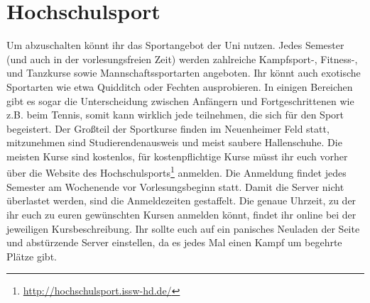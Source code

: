 \section{Hochschulsport}
Um abzuschalten könnt ihr das Sportangebot der Uni nutzen. Jedes Semester (und auch in der vorlesungsfreien Zeit) werden zahlreiche Kampfsport-, Fitness-, und Tanzkurse sowie Mannschaftssportarten angeboten. Ihr könnt auch exotische Sportarten wie etwa Quidditch oder Fechten ausprobieren. In einigen Bereichen gibt es sogar die Unterscheidung zwischen Anfängern und Fortgeschrittenen wie z.B. beim Tennis, somit kann wirklich jede teilnehmen, die sich für den Sport begeistert.
Der Großteil der Sportkurse finden im Neuenheimer Feld statt, mitzunehmen sind Studierendenausweis und meist saubere Hallenschuhe.
Die meisten Kurse sind kostenlos, für kostenpflichtige Kurse müsst ihr euch vorher über die Website des Hochschulsports\footnote{\url{http://hochschulsport.issw-hd.de/}} anmelden. Die Anmeldung findet jedes Semester am Wochenende vor Vorlesungsbeginn statt. Damit die Server nicht überlastet werden, sind die Anmeldezeiten gestaffelt. Die genaue Uhrzeit, zu der ihr euch zu euren gewünschten Kursen anmelden könnt, findet ihr online bei der jeweiligen Kursbeschreibung. Ihr sollte euch auf ein panisches Neuladen der Seite und abstürzende Server einstellen, da es jedes Mal einen Kampf um begehrte Plätze gibt.
